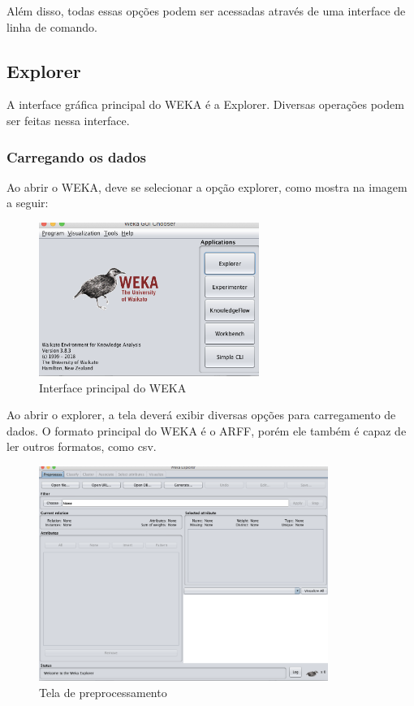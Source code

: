 Além disso, todas essas opções podem ser acessadas através de uma interface de linha de comando.

\subsection{Explorer}
A interface gráfica principal do WEKA é a Explorer. Diversas operações podem ser feitas nessa interface.

\subsubsection{Carregando os dados}
Ao abrir o WEKA, deve se selecionar a opção explorer, como mostra na imagem a seguir:

\begin{figure}[H]
\centering
\includegraphics[height=5cm]{imagens/wekaprincipal.png}
\caption{Interface principal do WEKA}
\label{figura18}
\end{figure}

Ao abrir o explorer, a tela deverá exibir diversas opções para carregamento de dados. O formato principal do WEKA é o ARFF, porém ele também é capaz de ler outros formatos, como csv.

\begin{figure}[H]
\centering
\includegraphics[height=7cm]{imagens/wekapreprocessempty.png}
\caption{Tela de preprocessamento}
\label{figura19}
\end{figure}

